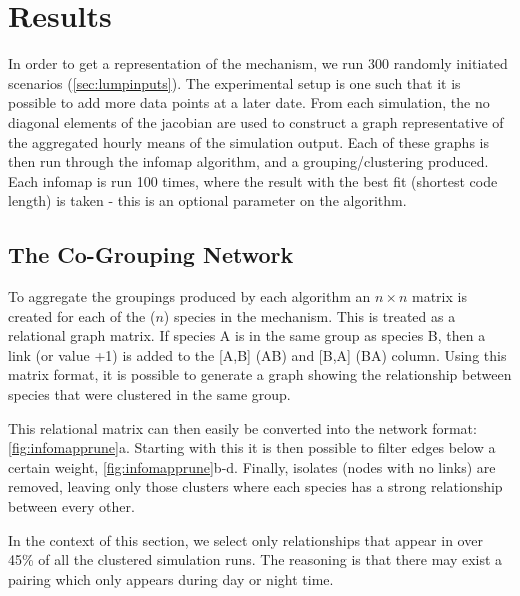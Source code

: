 %


\section{Results}

In order to get a representation of the mechanism, we run 300 randomly initiated scenarios (\autoref{sec:lumpinputs}). The experimental setup is one such that it is possible to add more data points at a later date. From each simulation, the no diagonal elements of the jacobian are used to construct a graph representative of the aggregated hourly means of the simulation output. Each of these graphs is then run through the infomap algorithm, and a grouping/clustering produced. Each infomap is run 100 times, where the result with the best fit (shortest code length) is taken - this is an optional parameter on the algorithm.

\subsection{The Co-Grouping Network}

To aggregate the groupings produced by each algorithm an $n\times n$ matrix is created for each of the ($n$) species in the mechanism. This is treated as a relational graph matrix. If species A is in the same group as species B, then a link (or value +1) is added to the [A,B] (A\ce{->}B) and [B,A] (B\ce{->}A) column. Using this matrix format, it is possible to generate a graph showing the relationship between species that were clustered in the same group.

This relational matrix can then easily be converted into the network format: \autoref{fig:infomapprune}a. Starting with this it is then possible to filter edges below a certain weight, \autoref{fig:infomapprune}b-d. Finally, isolates (nodes with no links) are removed, leaving only those clusters where each species has a strong relationship between every other.

In the context of this section, we select only relationships that appear in over 45\% of all the clustered simulation runs. The reasoning is that there may exist a pairing which only appears during day or night time.

